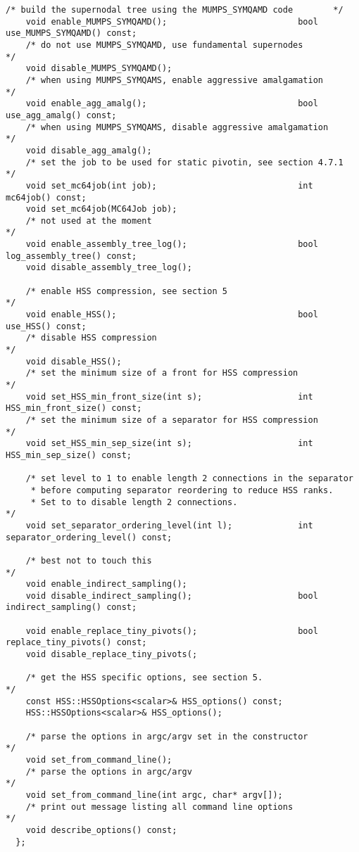 \documentclass{article}
\begin{document}
\begin{lstlisting}[style=C]
    /* build the supernodal tree using the MUMPS_SYMQAMD code        */
    void enable_MUMPS_SYMQAMD();                          bool use_MUMPS_SYMQAMD() const;
    /* do not use MUMPS_SYMQAMD, use fundamental supernodes          */
    void disable_MUMPS_SYMQAMD();
    /* when using MUMPS_SYMQAMS, enable aggressive amalgamation      */
    void enable_agg_amalg();                              bool use_agg_amalg() const;
    /* when using MUMPS_SYMQAMS, disable aggressive amalgamation      */
    void disable_agg_amalg();
    /* set the job to be used for static pivotin, see section 4.7.1   */
    void set_mc64job(int job);                            int mc64job() const;
    void set_mc64job(MC64Job job);
    /* not used at the moment                                         */
    void enable_assembly_tree_log();                      bool log_assembly_tree() const;
    void disable_assembly_tree_log();

    /* enable HSS compression, see section 5                          */
    void enable_HSS();                                    bool use_HSS() const;
    /* disable HSS compression                                        */
    void disable_HSS();
    /* set the minimum size of a front for HSS compression            */
    void set_HSS_min_front_size(int s);                   int HSS_min_front_size() const;
    /* set the minimum size of a separator for HSS compression        */
    void set_HSS_min_sep_size(int s);                     int HSS_min_sep_size() const;

    /* set level to 1 to enable length 2 connections in the separator
     * before computing separator reordering to reduce HSS ranks.
     * Set to to disable length 2 connections.                        */
    void set_separator_ordering_level(int l);             int separator_ordering_level() const;

    /* best not to touch this                                         */
    void enable_indirect_sampling();
    void disable_indirect_sampling();                     bool indirect_sampling() const;

    void enable_replace_tiny_pivots();                    bool replace_tiny_pivots() const;
    void disable_replace_tiny_pivots(;

    /* get the HSS specific options, see section 5.                   */
    const HSS::HSSOptions<scalar>& HSS_options() const;
    HSS::HSSOptions<scalar>& HSS_options();

    /* parse the options in argc/argv set in the constructor          */
    void set_from_command_line();
    /* parse the options in argc/argv                                 */
    void set_from_command_line(int argc, char* argv[]);
    /* print out message listing all command line options             */
    void describe_options() const;
  };
\end{lstlisting}
\end{document}
